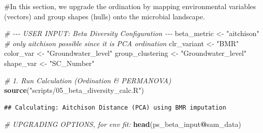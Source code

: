 \documentclass[
]{article}
\newenvironment{Shaded}{\begin{snugshade}}{\end{snugshade}}
\newcommand{\CommentTok}[1]{\textcolor[rgb]{0.56,0.35,0.01}{\textit{#1}}}
\newcommand{\FunctionTok}[1]{\textcolor[rgb]{0.13,0.29,0.53}{\textbf{#1}}}
\newcommand{\NormalTok}[1]{#1}
\newcommand{\OtherTok}[1]{\textcolor[rgb]{0.56,0.35,0.01}{#1}}
\newcommand{\SpecialCharTok}[1]{\textcolor[rgb]{0.81,0.36,0.00}{\textbf{#1}}}
\newcommand{\StringTok}[1]{\textcolor[rgb]{0.31,0.60,0.02}{#1}}
\begin{document}
\#In this section, we upgrade the ordination by mapping environmental
variables (vectors) and group shapes (hulls) onto the microbial
landscape.

\begin{Shaded}
\begin{Highlighting}[]
\CommentTok{\# {-}{-}{-} USER INPUT: Beta Diversity Configuration {-}{-}{-}}
\NormalTok{beta\_metric      }\OtherTok{\textless{}{-}} \StringTok{"aitchison"} \CommentTok{\# only aitchison possible since it is PCA ordination}
\NormalTok{clr\_variant      }\OtherTok{\textless{}{-}} \StringTok{"BMR"}
\NormalTok{color\_var        }\OtherTok{\textless{}{-}} \StringTok{"Groundwater\_level"}
\NormalTok{group\_clustering }\OtherTok{\textless{}{-}} \StringTok{"Groundwater\_level"}
\NormalTok{shape\_var        }\OtherTok{\textless{}{-}} \StringTok{"SC\_Number"}

\CommentTok{\# 1. Run Calculation (Ordination \& PERMANOVA)}
\FunctionTok{source}\NormalTok{(}\StringTok{"scripts/05\_beta\_diversity\_calc.R"}\NormalTok{)}
\end{Highlighting}
\end{Shaded}

\begin{verbatim}
## Calculating: Aitchison Distance (PCA) using BMR imputation
\end{verbatim}

\begin{Shaded}
\begin{Highlighting}[]
\CommentTok{\# UPGRADING OPTIONS, for env fit:}
\FunctionTok{head}\NormalTok{(ps\_beta\_input}\SpecialCharTok{@}\NormalTok{sam\_data)}
\end{Highlighting}
\end{Shaded}
\end{document}
